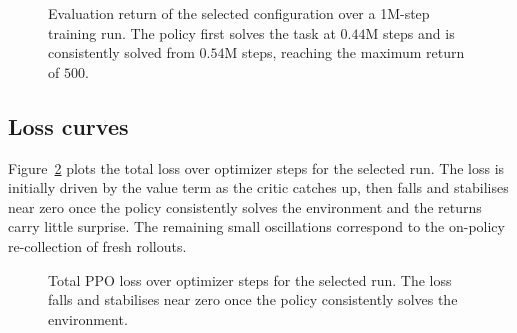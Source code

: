 \documentclass{article}
\begin{document}
\begin{figure}[H]
  \caption{Evaluation return of the selected configuration over a 1M-step training run. The policy first solves the task at $0.44$M steps and is consistently solved from $0.54$M steps, reaching the maximum return of $500$.}
  \label{fig:learning-progress}
\end{figure}

\subsection{Loss curves}

Figure~\ref{fig:loss-curve} plots the total loss over optimizer steps for the selected run. The loss is initially driven by the value term as the critic catches up, then falls and stabilises near zero once the policy consistently solves the environment and the returns carry little surprise. The remaining small oscillations correspond to the on-policy re-collection of fresh rollouts.

\begin{figure}[H]
  \centering
  \caption{Total PPO loss over optimizer steps for the selected run. The loss falls and stabilises near zero once the policy consistently solves the environment.}
  \label{fig:loss-curve}
\end{figure}
\end{document}
